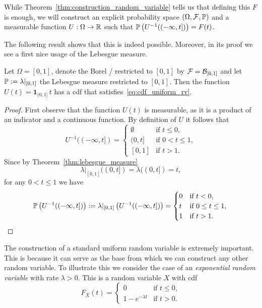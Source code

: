 While Theorem~\ref{thm:construction_random_variable} tells us that defining this $F$ is enough, we will construct an explicit probability space $(\Omega,\mathcal F, \mathbb P)$ and a measurable function $U : \Omega \to \mathbb R$ such that $	\mathbb P\left(U^{-1}((-\infty,t])\right) = F(t)$.

The following result shows that this is indeed possible. Moreover, in its proof we see a first nice usage of the Lebesgue measure.

\begin{lemma}\label{lem:uniform_random_variable}
Let $\Omega = [0,1]$, denote the Borel \sigalg/ restricted to $[0,1]$ by $\mathcal F = \mathcal B_{[0,1]}$ and let $\mathbb P := \lambda|_{[0,1]}$ the Lebesgue measure restricted to $[0,1]$. Then the function $U(t) = \mathbf{1}_{(0,1]} \, t$ has a cdf that satisfies~\eqref{eq:cdf_uniform_rv}.
\end{lemma}

\begin{proof}
First observe that the function $U(t)$ is measurable, as it is a product of an indicator and a continuous function. By definition of $U$ it follows that
\[
	U^{-1}((-\infty,t]) = \begin{cases}
		\emptyset &\text{if } t \le 0,\\
		(0,t] &\text{if } 0 < t \le 1, \\
		[0,1] &\text{if } t > 1.
	\end{cases}
\]
Since by Theorem~\ref{thm:lebesgue_measure}
\[
	\lambda|_{[0,1]}((0,t]) = \lambda((0,t]) = t,
\]
for any $0 < t \le 1$ we have
\[
	\mathbb P\left(U^{-1}((-\infty,t])\right) := \lambda|_{[0,1]}\left(U^{-1}((-\infty,t])\right)
	= \begin{cases}
		0 &\text{if } t < 0,\\
		t &\text{if } 0 \le t\le 1,\\
		1 &\text{if } t > 1.
	\end{cases}\qedhere
\]
\end{proof}

The construction of a standard uniform random variable is extremely important. This is because it can serve as the base from which we can construct any other random variable. To illustrate this we consider the case of an \emph{exponential random variable} with rate $\lambda > 0$. This is a random variable $X$ with cdf
\[
	F_X(t) = \begin{cases}
		0 &\text{if } t \le 0,\\
		1-e^{-\lambda t} &\text{if } t > 0.
	\end{cases}
\]

